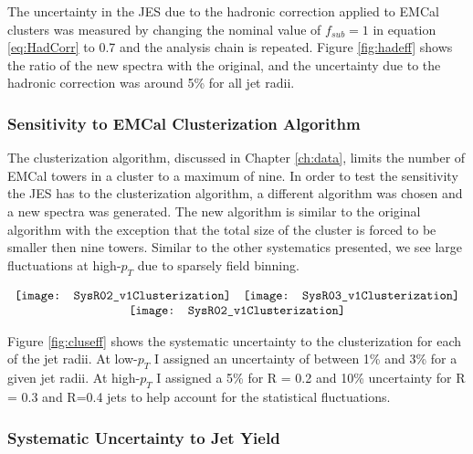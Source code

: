 The uncertainty in the JES due to the hadronic correction applied to EMCal clusters was measured by changing the nominal value of $f_{sub} = 1$ in equation \ref{eq:HadCorr} to 0.7 and the analysis chain is repeated.  Figure \ref{fig:hadeff} shows the ratio of the new spectra with the original, and the uncertainty due to the hadronic correction was around 5\% for all jet radii.

\subsubsection{Sensitivity to EMCal Clusterization Algorithm}
The clusterization algorithm, discussed in Chapter \ref{ch:data}, limits the number of EMCal towers in a cluster to a maximum of nine.  In order to test the sensitivity the JES has to the clusterization algorithm, a different algorithm was chosen and a new spectra was generated.  The new algorithm is similar to the original algorithm with the exception that the total size of the cluster is forced to be smaller then nine towers.  Similar to the other systematics presented, we see large fluctuations at high-$p_{T}$ due to sparsely field binning.  

\begin{figure*}[t!]
$\begin{array}{rl}
    \texttt{[image: SysR02\_v1Clusterization]} &
    \texttt{[image: SysR03\_v1Clusterization]}\\
    \multicolumn{2}{c}{\texttt{[image: SysR02\_v1Clusterization]}}
\end{array}$
\caption[Systematic due to clusterization algorithm.]{\label{fig:cluseff}Systematic due to EMCal clusterization algorithm; R = 0.2 \textit{(top left)}, R = 0.3 \textit{(top right)}, R = 0.4 \textit{(bottom)}.}
\end{figure*}

Figure \ref{fig:cluseff} shows the systematic uncertainty to the clusterization for each of the jet radii.  At low-$p_{T}$ I assigned an uncertainty of between 1\% and 3\% for a given jet radii.  At high-$p_{T}$ I assigned a 5\% for R = 0.2 and 10\% uncertainty for R = 0.3 and R=0.4 jets to help account for the statistical fluctuations.

\subsubsection{Systematic Uncertainty to Jet Yield}

